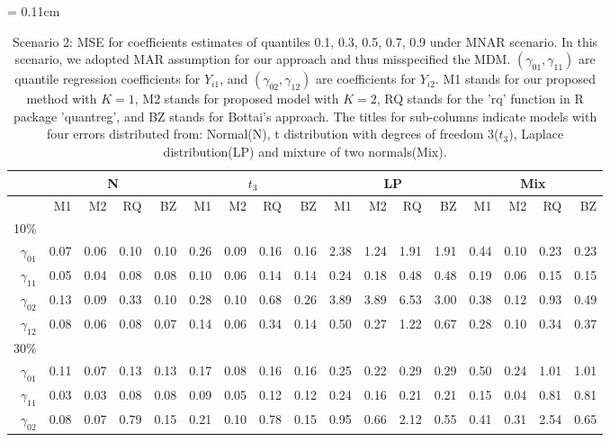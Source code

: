 \documentclass[useAMS,usenatbib,referee]{biom}
\begin{document}
  \begin{table}
\centering
    \caption{Scenario 2: MSE for coefficients estimates of quantiles 0.1, 0.3, 0.5, 0.7, 0.9 under MNAR scenario.
In this scenario, we adopted MAR assumption for our approach and thus misspecified the MDM.
$(\gamma_{01}, \gamma_{11})$ are quantile regression coefficients for $Y_{i1}$, and $(\gamma_{02}, \gamma_{12})$ are coefficients for $Y_{i2}$. M1 stands for our proposed method with $K = 1$, M2 stands for proposed model with $K = 2$, RQ stands for the 'rq' function in R package 'quantreg', and BZ stands for Bottai's approach.
The titles for sub-columns indicate models with four errors distributed from: Normal(N), t distribution with degrees of freedom 3($t_3$),
Laplace distribution(LP) and mixture of two normals(Mix).
}\label{tab:sim2}
    \vspace{10pt} \tabcolsep = 0.11cm
    \begin{tabular}{rrrrrrrrrrrrrrrrr}
      \hline
              & \multicolumn{4}{c}{N} & \multicolumn{4}{c}{$t_3$}   & \multicolumn{4}{c}{LP}   & \multicolumn{4}{c}{Mix}   \\
      \hline
           & M1                      & M2 & RQ & BZ   & M1                      & M2 & RQ & BZ   & M1                      & M2 & RQ & BZ   & M1                      & M2 & RQ & BZ \\
10\%  \\
$\gamma_{01}$ & 0.07 & 0.06 & 0.10 & 0.10 & 0.26 & 0.09 & 0.16 & 0.16 & 2.38 & 1.24 & 1.91 & 1.91 & 0.44 & 0.10 & 0.23 & 0.23 \\
$\gamma_{11}$ & 0.05 & 0.04 & 0.08 & 0.08 & 0.10 & 0.06 & 0.14 & 0.14 & 0.24 & 0.18 & 0.48 & 0.48 & 0.19 & 0.06 & 0.15 & 0.15 \\
$\gamma_{02}$ & 0.13 & 0.09 & 0.33 & 0.10 & 0.28 & 0.10 & 0.68 & 0.26 & 3.89 & 3.89 & 6.53 & 3.00 & 0.38 & 0.12 & 0.93 & 0.49 \\
$\gamma_{12}$ & 0.08 & 0.06 & 0.08 & 0.07 & 0.14 & 0.06 & 0.34 & 0.14 & 0.50 & 0.27 & 1.22 & 0.67 & 0.28 & 0.10 & 0.34 & 0.37 \\
30\% \\
$\gamma_{01}$ & 0.11 & 0.07 & 0.13 & 0.13 & 0.17 & 0.08 & 0.16 & 0.16 & 0.25 & 0.22 & 0.29 & 0.29 & 0.50 & 0.24 & 1.01 & 1.01 \\
$\gamma_{11}$ & 0.03 & 0.03 & 0.08 & 0.08 & 0.09 & 0.05 & 0.12 & 0.12 & 0.24 & 0.16 & 0.21 & 0.21 & 0.15 & 0.04 & 0.81 & 0.81 \\
$\gamma_{02}$ & 0.08 & 0.07 & 0.79 & 0.15 & 0.21 & 0.10 & 0.78 & 0.15 & 0.95 & 0.66 & 2.12 & 0.55 & 0.41 & 0.31 & 2.54 & 0.65 \\

\end{tabular}
\end{table}
\end{document}
